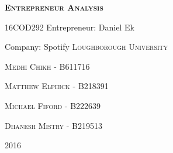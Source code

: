 \begin{titlepage}
\begin{center}
\textbf{\textsc{\Huge Entrepreneur Analysis}}
\par
\vspace{0.5cm}
\textsc{\huge 16COD292}
\vfill
\Huge Entrepreneur: Daniel Ek
\par
\Huge Company: Spotify
\vfill
\textsc{\Huge Loughborough University}
\vspace{1cm}
\par
\textsc{\huge Medhi Chikh - B611716}
\par
\vspace{0.2cm}
\textsc{\huge Matthew Elphick - B218391}
\par
\vspace{0.2cm}
\textsc{\huge Michael Fiford - B222639}
\par
\vspace{0.2cm}
\textsc{\huge Dhanesh Mistry - B219513}
\vspace{1cm}
\par
\textsc{\Huge 2016}
\end{center}
\end{titlepage}